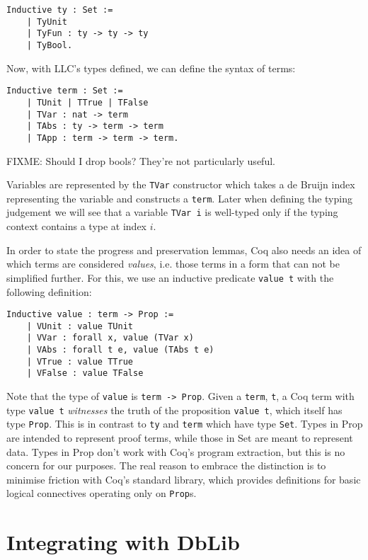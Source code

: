 \documentclass[]{unswthesis}
\let\c\texttt
\let\i\textit
\begin{document}
\begin{verbatim}
Inductive ty : Set :=
    | TyUnit
    | TyFun : ty -> ty -> ty
    | TyBool.
\end{verbatim}

Now, with LLC's types defined, we can define the syntax of terms:

\begin{verbatim}
Inductive term : Set :=
    | TUnit | TTrue | TFalse
    | TVar : nat -> term
    | TAbs : ty -> term -> term
    | TApp : term -> term -> term.
\end{verbatim}

FIXME: Should I drop bools? They're not particularly useful.

Variables are represented by the \c{TVar} constructor which takes a de Bruijn index representing the variable and constructs a \c{term}. Later when defining the typing judgement we will see that a variable \c{TVar i} is well-typed only if the typing context contains a type at index $i$.

In order to state the progress and preservation lemmas, Coq also needs an idea of which terms are considered \i{values}, i.e. those terms in a form that can not be simplified further. For this, we use an inductive predicate \c{value t} with the following definition:

\begin{verbatim}
Inductive value : term -> Prop :=
    | VUnit : value TUnit
    | VVar : forall x, value (TVar x)
    | VAbs : forall t e, value (TAbs t e)
    | VTrue : value TTrue
    | VFalse : value TFalse
\end{verbatim}

Note that the type of \c{value} is \c{term -> Prop}. Given a \c{term}, \c{t}, a Coq term with type \c{value t} \i{witnesses} the truth of the proposition \c{value t}, which itself has type \c{Prop}. This is in contrast to \c{ty} and \c{term} which have type \c{Set}. Types in Prop are intended to represent proof terms, while those in Set are meant to represent data. Types in Prop don't work with Coq's program extraction, but this is no concern for our purposes. The real reason to embrace the distinction is to minimise friction with Coq's standard library, which provides definitions for basic logical connectives operating only on \c{Prop}s.

\section{Integrating with DbLib}
\end{document}
